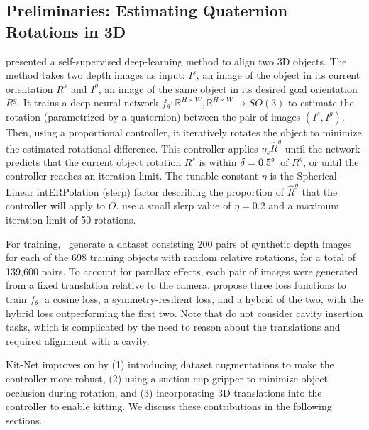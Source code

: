 \subsection{Preliminaries: Estimating Quaternion Rotations in 3D}
\label{subsec:prelims}
\citet{CASE_Orienting} presented a self-supervised deep-learning method to align
two 3D objects.
The method takes two depth images as input: $I^s$, an image of the object in its current orientation $R^s$ and $I^g$, an image of the same object in its desired goal orientation $R^g$. It trains a deep neural network $f_\theta:\mathbb{R}^{H\times W},\mathbb{R}^{H\times W} \rightarrow SO(3)$
to estimate the rotation (parametrized by a quaternion) between the pair of images $(I^s, I^g)$.
Then, using a proportional controller, it iteratively rotates the object to minimize the estimated rotational difference. This controller applies $\eta{_s}\hat{R}^g$ until
the network predicts that the current object rotation $R^s$ is within $\delta = 0.5\degree$~of $R^g$, or until the controller reaches an iteration limit. The tunable constant $\eta$ is the Spherical-Linear intERPolation (slerp) factor describing the proportion of $\hat{R}^g$ that the controller will apply to $O$. \citeauthor{CASE_Orienting} use a small slerp value of $\eta=0.2$ and a maximum iteration limit of 50 rotations.

For training,~\citeauthor{CASE_Orienting} generate a dataset consisting 200 pairs of synthetic depth images for each of the 698 training objects with random relative rotations, for a total of 139,600 pairs. To account for parallax effects, each pair of images were generated from a fixed translation relative to the camera.
\citeauthor{CASE_Orienting} propose three loss functions to train $f_\theta$: a cosine loss, a symmetry-resilient loss, and a hybrid of the two, with the hybrid loss outperforming the first two. Note that \citeauthor{CASE_Orienting} do not consider cavity insertion tasks, which is complicated by the need to reason about the translations and required alignment with a cavity. 

Kit-Net improves on \citeauthor{CASE_Orienting} by (1) introducing dataset augmentations to make the controller more robust, (2) using a suction cup gripper to minimize object occlusion during rotation, and (3) incorporating 3D translations into the controller to enable kitting. We discuss these contributions in the following sections.

